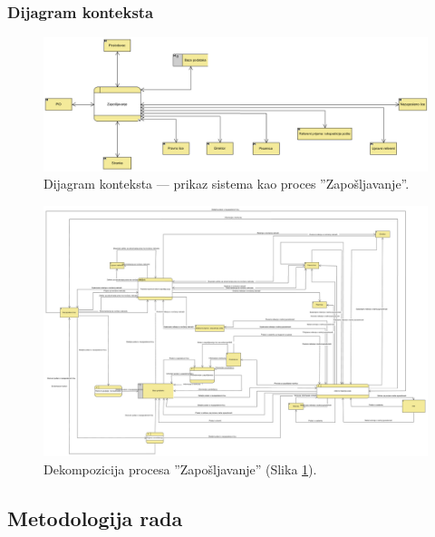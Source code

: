 \begin{mylandscape}
	\subsubsection{Dijagram konteksta}
	
	\begin{figure}[H]
		\centering
		\includegraphics[width=0.8\paperwidth]{dijagrami/dijagrami-toka-podataka/zaposljavanje-dijagram-konteksta.png}
		\caption{Dijagram konteksta — prikaz sistema kao proces ''Zapo\v sljavanje''.}
		\label{dtp: dijagram konteksta}
	\end{figure}

	\newpage
	
	\begin{figure}[H]
		\centering
		\includegraphics[width=0.7\paperwidth]{dijagrami/dijagrami-toka-podataka/zaposljavanje-dtp-nivoa-0.png}
		\caption{Dekompozicija procesa ''Zapo\v sljavanje'' (Slika \ref{dtp: dijagram konteksta}).}
	\end{figure}

\end{mylandscape}

\subsection{Metodologija rada}

